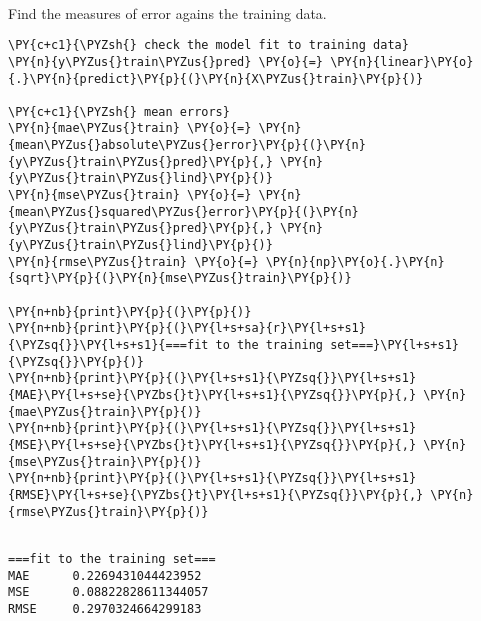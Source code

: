     \begin{center}
    \end{center}
    { \hspace*{\fill} \\}
    
    Find the measures of error agains the training data.

    \begin{tcolorbox}[breakable, size=fbox, boxrule=1pt, pad at break*=1mm,colback=cellbackground, colframe=cellborder]
\begin{Verbatim}[commandchars=\\\{\}]
\PY{c+c1}{\PYZsh{} check the model fit to training data}
\PY{n}{y\PYZus{}train\PYZus{}pred} \PY{o}{=} \PY{n}{linear}\PY{o}{.}\PY{n}{predict}\PY{p}{(}\PY{n}{X\PYZus{}train}\PY{p}{)}

\PY{c+c1}{\PYZsh{} mean errors}
\PY{n}{mae\PYZus{}train} \PY{o}{=} \PY{n}{mean\PYZus{}absolute\PYZus{}error}\PY{p}{(}\PY{n}{y\PYZus{}train\PYZus{}pred}\PY{p}{,} \PY{n}{y\PYZus{}train\PYZus{}lind}\PY{p}{)}
\PY{n}{mse\PYZus{}train} \PY{o}{=} \PY{n}{mean\PYZus{}squared\PYZus{}error}\PY{p}{(}\PY{n}{y\PYZus{}train\PYZus{}pred}\PY{p}{,} \PY{n}{y\PYZus{}train\PYZus{}lind}\PY{p}{)}
\PY{n}{rmse\PYZus{}train} \PY{o}{=} \PY{n}{np}\PY{o}{.}\PY{n}{sqrt}\PY{p}{(}\PY{n}{mse\PYZus{}train}\PY{p}{)}

\PY{n+nb}{print}\PY{p}{(}\PY{p}{)}
\PY{n+nb}{print}\PY{p}{(}\PY{l+s+sa}{r}\PY{l+s+s1}{\PYZsq{}}\PY{l+s+s1}{===fit to the training set===}\PY{l+s+s1}{\PYZsq{}}\PY{p}{)}
\PY{n+nb}{print}\PY{p}{(}\PY{l+s+s1}{\PYZsq{}}\PY{l+s+s1}{MAE}\PY{l+s+se}{\PYZbs{}t}\PY{l+s+s1}{\PYZsq{}}\PY{p}{,} \PY{n}{mae\PYZus{}train}\PY{p}{)}
\PY{n+nb}{print}\PY{p}{(}\PY{l+s+s1}{\PYZsq{}}\PY{l+s+s1}{MSE}\PY{l+s+se}{\PYZbs{}t}\PY{l+s+s1}{\PYZsq{}}\PY{p}{,} \PY{n}{mse\PYZus{}train}\PY{p}{)}
\PY{n+nb}{print}\PY{p}{(}\PY{l+s+s1}{\PYZsq{}}\PY{l+s+s1}{RMSE}\PY{l+s+se}{\PYZbs{}t}\PY{l+s+s1}{\PYZsq{}}\PY{p}{,} \PY{n}{rmse\PYZus{}train}\PY{p}{)}
\end{Verbatim}
\end{tcolorbox}

    \begin{Verbatim}[commandchars=\\\{\}]

===fit to the training set===
MAE      0.2269431044423952
MSE      0.08822828611344057
RMSE     0.2970324664299183
    \end{Verbatim}

